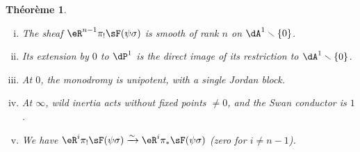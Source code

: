 \documentclass[oneside]{book}
\newcommand{\iso}{\xrightarrow\sim}
\renewcommand{\setminus}{\smallsetminus}
\theoremstyle{sga-source}
\theoremstyle{sga-source-dash}
\theoremstyle{sga-source-dotdash}
\theoremstyle{sga-source-number-note-dash}
\theoremstyle{sga-source-note-number-dotdash}
\theoremstyle{sga-source-example-dotdash}
\theoremstyle{sga-source-inline-number}
\theoremstyle{sga-source-bare-number}
\theoremstyle{sga-source}
\newtheorem{theorem_}[subsection]{Théorème}
\newcommand{\PrintPage}[1]{}\newcommand{\MathPage}[1]{}\newcommand{\PrintCite}[2]{#1}\newcommand{\var}[3]{#2}
\begin{document}
\begin{theorem_}\label{VI:7-8}
\begin{enumerate}[(i)]
  \item The sheaf $\eR^{n-1}\pi_! \sF(\psi\sigma)$ is smooth of rank $n$ on 
    $\dA^1\setminus \{0\}$. 
  \item Its extension by $0$ to $\dP^1$ is the direct image of its 
    restriction to $\dA^1\setminus \{0\}$. 
  \PrintPage{222}
\item At $0$, the monodromy is unipotent, with a single Jordan block.
  \item At $\infty$, wild inertia acts without fixed points $\ne 0$, and the 
    Swan conductor is $1$. 
  \item We have $\eR^i \pi_! \sF(\psi\sigma) \iso \eR^i \pi_\ast \sF(\psi\sigma)$ 
    (zero for $i\ne n-1$).
\end{enumerate}
\end{theorem_}
\end{document}
